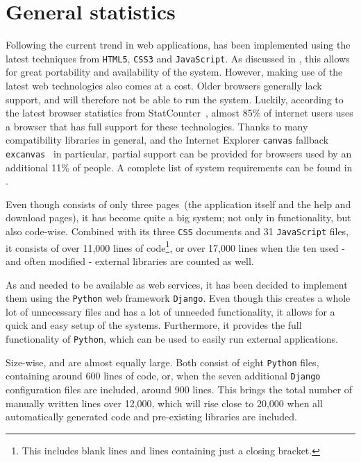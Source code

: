 \section{General statistics}
Following the current trend in web applications, \oframp{} has been implemented using the latest techniques from \verb|HTML5|, \verb|CSS3| and \verb|JavaScript|. As discussed in , this allows for great portability and availability of the system. However, making use of the latest web technologies also comes at a cost. Older browsers generally lack support, and will therefore not be able to run the system. Luckily, according to the latest browser statistics from StatCounter~\cite{statcounter2014statcounter}, almost 85\% of internet users uses a browser that has full support for these technologies. Thanks to many compatibility libraries in general, and the Internet Explorer \verb|canvas| fallback \verb|excanvas|~\cite{arvidsson2009explorercanvas} in particular, partial support can be provided for browsers used by an additional 11\% of people. A complete list of system requirements can be found in .

Even though \oframp{} consists of only three pages~(the application itself and the help and download pages), it has become quite a big system; not only in functionality, but also code-wise. Combined with its three \verb|CSS| documents and 31 \verb|JavaScript| files, it consists of over 11,000 lines of code\footnote{This includes blank lines and lines containing just a closing bracket.}, or over 17,000 lines when the ten used - and often modified - external libraries are counted as well.

As \oapoc{} and \omfraf{} needed to be available as web services, it has been decided to implement them using the \verb|Python| web framework \verb|Django|. Even though this creates a whole lot of unnecessary files and has a lot of unneeded functionality, it allows for a quick and easy setup of the systems. Furthermore, it provides the full functionality of \verb|Python|, which can be used to easily run external applications.

Size-wise, \oapoc{} and \omfraf{} are almost equally large. Both consist of eight \verb|Python| files, containing around 600 lines of code, or, when the seven additional \verb|Django| configuration files are included, around 900 lines. This brings the total number of manually written lines over 12,000, which will rise close to 20,000 when all automatically generated code and pre-existing libraries are included.



